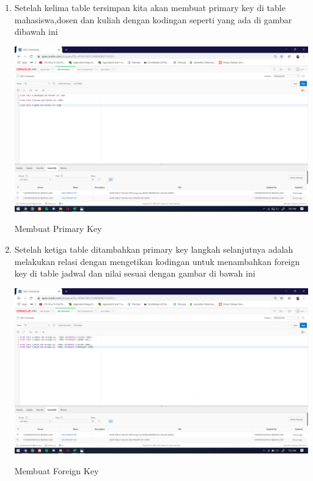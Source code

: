\documentclass{article}
\begin{document}
\begin{enumerate}
     \item Setelah kelima table tersimpan kita akan membuat primary key di table mahasiswa,dosen dan kuliah dengan kodingan seperti yang ada di gambar dibawah ini
    \begin{center}
         \centering
            \includegraphics[scale=0.27]{figures/DB6.png}
        \caption{Membuat Primary Key}
        \label{excel}
    \end{center}
    
      \item Setelah ketiga table ditambahkan primary key langkah selanjutnya adalah melakukan relasi dengan mengetikan kodingan untuk menambahkan foreign key di table jadwal dan nilai sesuai dengan gambar di bawah ini 
    \begin{center}
         \centering
            \includegraphics[scale=0.27]{figures/DB7.png}
        \caption{Membuat Foreign Key}
        \label{excel}
    \end{center}
    

\end{enumerate}
\end{document}
